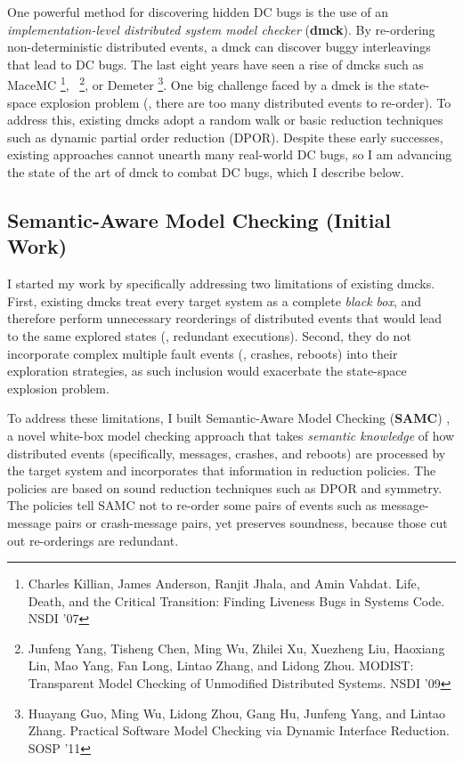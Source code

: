 \documentclass[11pt]{article}
\begin{document}
One powerful method for discovering hidden DC bugs is the use of an
\textit{implementation-level distributed system model checker} (\textbf{dmck}).
By re-ordering non-deterministic distributed events, a dmck can discover buggy
interleavings that lead to DC bugs. The last eight years have seen a rise of
dmcks such as MaceMC \footnote{Charles Killian, James Anderson, Ranjit Jhala,
and Amin Vahdat. Life, Death, and the Critical Transition: Finding Liveness Bugs
in Systems Code. NSDI '07}, \modist\ \footnote{Junfeng Yang, Tisheng Chen, Ming
Wu, Zhilei Xu, Xuezheng Liu, Haoxiang Lin, Mao Yang, Fan Long, Lintao Zhang, and
Lidong Zhou. MODIST: Transparent Model Checking of Unmodified Distributed
Systems. NSDI '09}, or Demeter \footnote{Huayang Guo, Ming Wu, Lidong Zhou, Gang
Hu, Junfeng Yang, and Lintao Zhang. Practical Software Model Checking via
Dynamic Interface Reduction. SOSP '11}. One big challenge faced by a dmck is the
state-space explosion problem (\ie, there are too many distributed events to
re-order). To address this, existing dmcks adopt a random walk or basic
reduction techniques such as dynamic partial order reduction (DPOR). Despite
these early successes, existing approaches cannot unearth many real-world DC
bugs, so I am advancing the state of the art of dmck to combat DC bugs, which I
describe below.

\subsection{Semantic-Aware Model Checking (Initial Work)} 

I started my work by specifically addressing two limitations of existing dmcks.
First, existing dmcks treat every target system as a complete \textit{black
box}, and therefore perform unnecessary reorderings of distributed events that
would lead to the same explored states (\ie, redundant executions). Second,
they do not incorporate complex multiple fault events (\eg, crashes, reboots)
into their exploration strategies, as such inclusion would exacerbate the
state-space explosion problem.

To address these limitations, I built Semantic-Aware Model Checking
(\textbf{SAMC}) \cite{Leesatapornwongsa+15-SamcIssta,Leesatapornwongsa+14-Samc},
a novel white-box model checking approach that takes \textit{semantic knowledge}
of how distributed events (specifically, messages, crashes, and reboots) are
processed by the target system and incorporates that information in reduction
policies.  The policies are based on sound reduction techniques such as DPOR and
symmetry.  The policies tell SAMC not to re-order some pairs of events such as
message-message pairs or crash-message pairs, yet preserves soundness, because
those cut out re-orderings are redundant.
\end{document}
